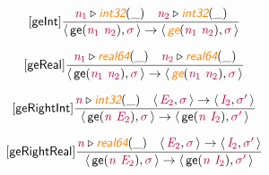 \documentclass[10pt,leqno,fleqn]{article}
\newcommand{\artVariable}[1]{\mbox{\color{purple}\em #1\/}}
\newcommand{\artConstructor}[1]{\mbox{\sf #1}}
\newcommand{\artSpecial}[1]{\mbox{\color{orange}\sf\em #1}}
\begin{document}
\begin{equation}
\tag*{[\artConstructor{\sf geInt}]}
\begin{split}\frac{ \artVariable{n$_{1}$}\triangleright \artSpecial{int32}(\_) \quad  \artVariable{n$_{2}$}\triangleright \artSpecial{int32}(\_) }{\langle\, \artConstructor{\sf ge}(\artVariable{n$_{1}$}\ \artVariable{n$_{2}$}), \artVariable{$\sigma$}\,\rangle \rightarrow \langle\, \artSpecial{ge}(\artVariable{n$_{1}$}\ \artVariable{n$_{2}$}), \artVariable{$\sigma$}\,\rangle }
\end{split}
\end{equation}

\begin{equation}
\tag*{[\artConstructor{\sf geReal}]}
\begin{split}\frac{ \artVariable{n$_{1}$}\triangleright \artSpecial{real64}(\_) \quad  \artVariable{n$_{2}$}\triangleright \artSpecial{real64}(\_) }{\langle\, \artConstructor{\sf ge}(\artVariable{n$_{1}$}\ \artVariable{n$_{2}$}), \artVariable{$\sigma$}\,\rangle \rightarrow \langle\, \artSpecial{ge}(\artVariable{n$_{1}$}\ \artVariable{n$_{2}$}), \artVariable{$\sigma$}\,\rangle }
\end{split}
\end{equation}

\begin{equation}
\tag*{[\artConstructor{\sf geRightInt}]}
\begin{split}\frac{ \artVariable{n}\triangleright \artSpecial{int32}(\_) \quad \langle\, \artVariable{E$_{2}$}, \artVariable{$\sigma$}\,\rangle \rightarrow \langle\, \artVariable{I$_{2}$}, \artVariable{$\sigma$\/$^\prime$}\,\rangle }{\langle\, \artConstructor{\sf ge}(\artVariable{n}\ \artVariable{E$_{2}$}), \artVariable{$\sigma$}\,\rangle \rightarrow \langle\, \artConstructor{\sf ge}(\artVariable{n}\ \artVariable{I$_{2}$}), \artVariable{$\sigma$\/$^\prime$}\,\rangle }
\end{split}
\end{equation}

\begin{equation}
\tag*{[\artConstructor{\sf geRightReal}]}
\begin{split}\frac{ \artVariable{n}\triangleright \artSpecial{real64}(\_) \quad \langle\, \artVariable{E$_{2}$}, \artVariable{$\sigma$}\,\rangle \rightarrow \langle\, \artVariable{I$_{2}$}, \artVariable{$\sigma$\/$^\prime$}\,\rangle }{\langle\, \artConstructor{\sf ge}(\artVariable{n}\ \artVariable{E$_{2}$}), \artVariable{$\sigma$}\,\rangle \rightarrow \langle\, \artConstructor{\sf ge}(\artVariable{n}\ \artVariable{I$_{2}$}), \artVariable{$\sigma$\/$^\prime$}\,\rangle }
\end{split}
\end{equation}
\end{document}
